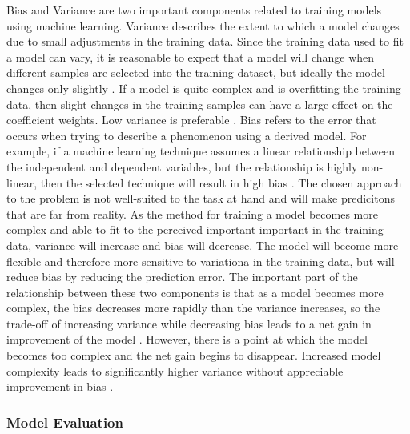 \documentclass[sigconf]{acmart}
\begin{document}
Bias and Variance are two important components related to training models using machine learning. Variance describes the extent to which a model changes due to small adjustments in the training data. Since the training data used to fit a model can vary, it is reasonable to expect that a model will change when different samples are selected into the training dataset, but ideally the model changes only slightly \cite{cite03}. If a model is quite complex and is overfitting the training data, then slight changes in the training samples can have a large effect on the coefficient weights. Low variance is preferable \cite{cite03}.
Bias refers to the error that occurs when trying to describe a phenomenon using a derived model. For example, if a machine learning technique assumes a linear relationship between the independent and dependent variables, but the relationship is highly non-linear, then the selected technique will result in high bias \cite{cite03}. The chosen approach to the problem is not well-suited to the task at hand and will make predicitons that are far from reality.
As the method for training a model becomes more complex and able to fit to the perceived important important in the training data, variance will increase and bias will decrease. The model will become more flexible and therefore more sensitive to variationa in the training data, but will reduce bias by reducing the prediction error. The important part of the relationship between these two components is that as a model becomes more complex, the bias decreases more rapidly than the variance increases, so the trade-off of increasing variance while decreasing bias leads to a net gain in improvement of the model \cite{cite03}. However, there is a point at which the model becomes too complex and the net gain begins to disappear. Increased model complexity leads to significantly higher variance without appreciable improvement in bias \cite{cite03}. 

\subsubsection{Model Evaluation}
\end{document}
